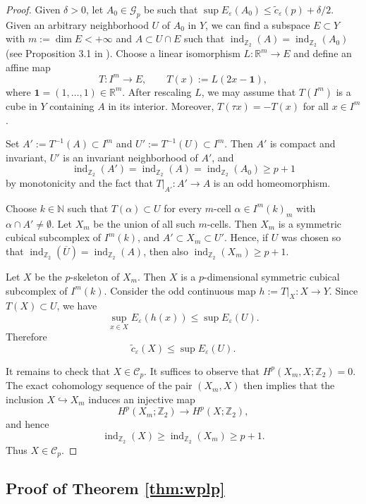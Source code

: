 \documentclass[12pt,english]{article}
\theoremstyle{definition}
\begin{document}
\begin{proof}
Given $\delta>0$, let $A_0 \in \mathcal{G}_p$ be such that $\sup E_\varepsilon(A_0) \leq \tilde c_\varepsilon(p) + \delta/2$. Given an arbitrary neighborhood $U$ of $A_0$ in $Y$, we can find a subspace $E\subset Y$ with $m:=\dim E<+\infty$ and $A \subset U \cap E$ such that $\operatorname{ind}_{\mathbb{Z}_2}(A)=\operatorname{ind}_{\mathbb{Z}_2}(A_0)$ (see Proposition 3.1 in \cite{Marzocchi}). Choose a linear isomorphism $L:\mathbb{R}^m\to E$ and define an affine map
\[
T:I^m\to E,
\qquad
T(x):=L(2x-\mathbf 1),
\]
where $\mathbf 1=(1,\dots,1)\in\mathbb{R}^m$.
After rescaling $L$, we may assume that $T(I^m)$ is a cube in $Y$
containing $A$ in its interior. Moreover, $T(\tau x)=-T(x)$ for all $x\in I^m$.

Set $A':=T^{-1}(A)\subset I^m$ and $U':=T^{-1}(U)\subset I^m$. Then $A'$ is compact and invariant, $U'$ is an invariant neighborhood of $A'$,
and
\[
\operatorname{ind}_{\mathbb{Z}_2}(A')=\operatorname{ind}_{\mathbb{Z}_2}(A)=\operatorname{ind}_{\mathbb{Z}_2}(A_0)\ge p+1
\]
by monotonicity and the fact that $T|_{A'}:A'\to A$ is an odd homeomorphism.

Choose $k\in\mathbb{N}$ such that $T(\alpha)\subset U$ for every $m$-cell $\alpha\in I^m(k)_m$ with $\alpha\cap A'\neq\emptyset$.
Let $X_m$ be the union of all such $m$-cells. Then $X_m$ is a symmetric cubical subcomplex of $I^m(k)$, and $A'\subset X_m\subset U'$. Hence, if $U$ was chosen so that $\operatorname{ind}_{\mathbb{Z}_2}(\overline U)=\operatorname{ind}_{\mathbb{Z}_2}(A)$, then also $\operatorname{ind}_{\mathbb{Z}_2}(X_m)\ge p+1$.

Let $X$ be the $p$-skeleton of $X_m$. Then $X$ is a $p$-dimensional symmetric
cubical subcomplex of $I^m(k)$. Consider the odd continuous map $h:=T|_X:X\to Y$. Since $T(X)\subset U$, we have
\[
\sup_{x\in X}E_\varepsilon(h(x))
\le \sup E_\varepsilon(U).
\]
Therefore
\[
\tilde c_\varepsilon(X)\le \sup E_\varepsilon(U).
\]

It remains to check that $X\in\mathcal C_p$. It suffices to observe that $H^p(X_m,X;\mathbb{Z}_2)=0$. The exact cohomology sequence of the pair $(X_m,X)$ then implies that the inclusion
$X\hookrightarrow X_m$ induces an injective map
\[
H^p(X_m;\mathbb{Z}_2)\to H^p(X;\mathbb{Z}_2),
\]
and hence
\[
\operatorname{ind}_{\mathbb{Z}_2}(X)\ge \operatorname{ind}_{\mathbb{Z}_2}(X_m)\ge p+1.
\]
Thus $X\in\mathcal C_p$.
\end{proof}

\subsection{Proof of Theorem \ref{thm:wplp}}
\end{document}
